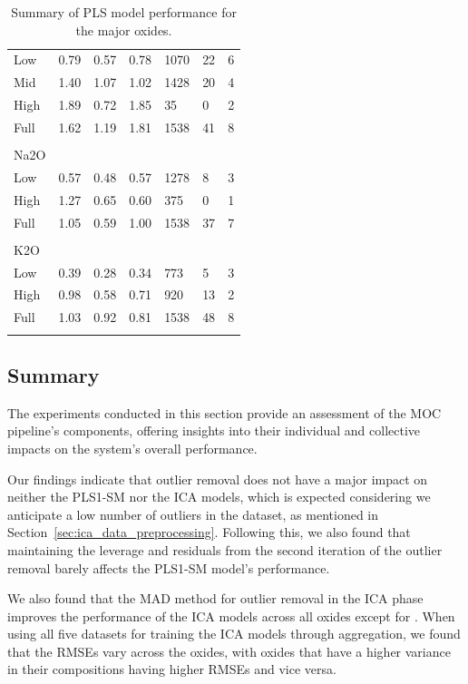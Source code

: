 \begin{table}[htbp]
\begin{tabular*}{\textwidth}{@{\extracolsep{\fill}} lllllll}
  Low & 0.79 & 0.57 & 0.78 & 1070 & 22 & 6 \\
  Mid & 1.40 & 1.07 & 1.02 & 1428 & 20 & 4 \\
  High & 1.89 & 0.72 & 1.85 & 35 & 0 & 2 \\
  Full & 1.62 & 1.19 & 1.81 & 1538 & 41 & 8 \\
\\
Na2O &&&&&& \\
  Low & 0.57 & 0.48 & 0.57 & 1278 & 8 & 3 \\
  High & 1.27 & 0.65 & 0.60 & 375 & 0 & 1 \\
  Full & 1.05 & 0.59 & 1.00 & 1538 & 37 & 7 \\
\\
K2O &&&&&& \\
  Low & 0.39 & 0.28 & 0.34 & 773 & 5 & 3 \\
  High & 0.98 & 0.58 & 0.71 & 920 & 13 & 2 \\
  Full & 1.03 & 0.92 & 0.81 & 1538 & 48 & 8 \\
\\

\end{tabular*}
\caption{Summary of PLS model performance for the major oxides.}
\label{table:rmsecv_results}
\end{table}








\subsection{Summary}\label{sec:experiments_summary}
The experiments conducted in this section provide an assessment of the MOC pipeline's components, offering insights into their individual and collective impacts on the system's overall performance.

Our findings indicate that outlier removal does not have a major impact on neither the PLS1-SM nor the ICA models, which is expected considering we anticipate a low number of outliers in the dataset, as mentioned in Section~\ref{sec:ica_data_preprocessing}.
Following this, we also found that maintaining the leverage and residuals from the second iteration of the outlier removal barely affects the PLS1-SM model's performance.

We also found that the MAD method for outlier removal in the ICA phase improves the performance of the ICA models across all oxides except for .
When using all five datasets for training the ICA models through aggregation, we found that the RMSEs vary across the oxides, with oxides that have a higher variance in their compositions having higher RMSEs and vice versa.

